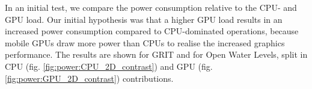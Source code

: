 \documentclass[review]{elsarticle}
\begin{document}

In an initial test, we compare the power consumption relative to the \gls{CPU}- and \gls{GPU} load. Our initial hypothesis was that a higher \gls{GPU} load results in an increased power consumption compared to \gls{CPU}-dominated operations, because mobile \glspl{GPU} draw more power than \glspl{CPU} to realise the increased graphics performance. The results are shown for \gls{GRIT} and for Open Water Levels, split in \gls{CPU} (fig. \ref{fig:power:CPU_2D_contrast}) and \gls{GPU} (fig. \ref{fig:power:GPU_2D_contrast}) contributions.
\end{document}
